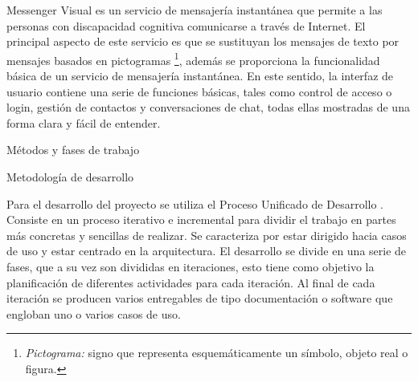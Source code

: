 \documentclass[12pt,a4paper,spanish,oneside]{report}
\makeatletter
\renewcommand{\section}{
  \@startsection{section}{1}{0mm}{\baselineskip}
  {2.5mm}{\huge\bf}
}
\renewcommand{\subsection}{
  \@startsection{subsection}{2}{0mm}{2mm}
  {4.0mm}{\Large\bf}
}
\theoremstyle{plain} \newtheorem{nota}{Nota}
\makeatother
\begin{document}
\begin{spacing}{1.5}
Messenger Visual \cite{MSN} es un servicio de mensajería instantánea que 
permite a las personas con discapacidad cognitiva comunicarse a través de 
Internet. El principal aspecto de este servicio es que se sustituyan los 
mensajes de texto por mensajes basados en pictogramas \footnote[2]{\emph{Pictograma:} signo que representa esquemáticamente un símbolo, objeto real o figura.},
 además se proporciona la funcionalidad básica de un servicio de mensajería 
instantánea. En este sentido, la interfaz de usuario contiene una serie de 
funciones básicas, tales como control de acceso o login, gestión de contactos 
y conversaciones de chat, todas ellas mostradas de una forma clara y fácil de 
entender.

\end{spacing}
\section{Métodos y fases de trabajo}
\subsection{Metodología de desarrollo}
\begin{spacing}{1.5}
Para el desarrollo del proyecto se utiliza el Proceso Unificado de Desarrollo
\cite{PUD}. Consiste en un proceso iterativo e incremental para dividir el 
trabajo en partes más concretas y sencillas de realizar. Se caracteriza por 
estar dirigido hacia casos de uso y estar centrado en la arquitectura. El 
desarrollo se divide en una serie de fases, que a su vez son divididas en 
iteraciones, esto tiene como objetivo la planificación de diferentes 
actividades para cada iteración. Al final de cada iteración se producen varios 
entregables de tipo documentación o software que engloban uno o varios casos de
 uso.
\end{spacing}
\end{document}
